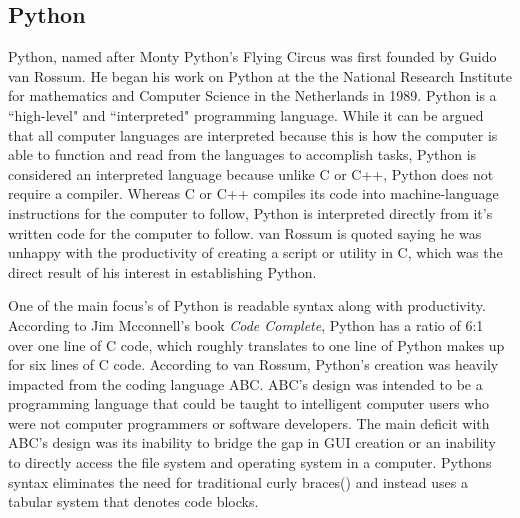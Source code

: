 \subsection{Python}
\label{sub:Python}
Python, named after Monty Python's Flying Circus was first founded by Guido van Rossum.  He began his work on Python at the the National Research Institute for mathematics and Computer Science in the Netherlands in 1989.  Python is a ``high-level" and ``interpreted" programming language.  While it can be argued that all computer languages are interpreted because this is how the computer is able to function and read from the languages to accomplish tasks, Python is considered an interpreted language because unlike C or C++, Python does not require a compiler.  Whereas C or C++ compiles its code into machine-language instructions for the computer to follow, Python is interpreted directly from it's written code for the computer to follow.  van Rossum is quoted saying he was unhappy with the productivity of creating a script or utility in C, which was the direct result of his interest in establishing Python\cite{vanBlog1}.

One of the main focus's of Python is readable syntax along with productivity.  According to Jim Mcconnell's book \textit{Code Complete}, Python has a ratio of 6:1 over one line of C code, which roughly translates to one line of Python makes up for six lines of C code\cite{mcconnell2004code}.  According to van Rossum, Python's creation was heavily impacted from the coding language ABC.  ABC's design was intended to be a programming language that could be taught to intelligent computer users who were not computer programmers or software developers.  The main deficit with ABC's design was its inability to bridge the gap in GUI creation or an inability to directly access the file system and operating system in a computer.  Pythons syntax eliminates the need for traditional curly braces({}) and instead uses a tabular system that denotes code blocks.
